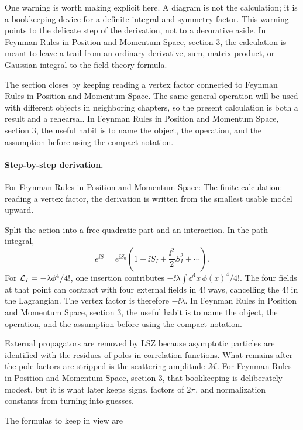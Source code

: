 One warning is worth making explicit here.  A diagram is not the calculation; it is a bookkeeping device for a definite integral and symmetry factor.  This warning points to the delicate step of the derivation, not to a decorative aside.  In Feynman Rules in Position and Momentum Space, section 3, the calculation is meant to leave a trail from an ordinary derivative, sum, matrix product, or Gaussian integral to the field-theory formula.

The section closes by keeping reading a vertex factor connected to Feynman Rules in Position and Momentum Space.  The same general operation will be used with different objects in neighboring chapters, so the present calculation is both a result and a rehearsal.  In Feynman Rules in Position and Momentum Space, section 3, the useful habit is to name the object, the operation, and the assumption before using the compact notation.



\paragraph{Step-by-step derivation.}

For Feynman Rules in Position and Momentum Space: The finite calculation: reading a vertex factor, the derivation is written from the smallest usable model upward.

Split the action into a free quadratic part and an interaction.  In the path integral,
\[
  e^{\ii S}=e^{\ii S_0}\left(1+\ii S_I+\frac{\ii^2}{2}S_I^2+\cdots\right).
\]
For \(\mathcal L_I=-\lambda\phi^4/4!\), one insertion contributes \(-\ii\lambda\int\dd^4x\,\phi(x)^4/4!\).  The four fields at that point can contract with four external fields in \(4!\) ways, cancelling the \(4!\) in the Lagrangian.  The vertex factor is therefore \(-\ii\lambda\).  In Feynman Rules in Position and Momentum Space, section 3, the useful habit is to name the object, the operation, and the assumption before using the compact notation.

External propagators are removed by LSZ because asymptotic particles are identified with the residues of poles in correlation functions.  What remains after the pole factors are stripped is the scattering amplitude \(\mathcal M\).  For Feynman Rules in Position and Momentum Space, section 3, that bookkeeping is deliberately modest, but it is what later keeps signs, factors of \(2\pi\), and normalization constants from turning into guesses.

The formulas to keep in view are

